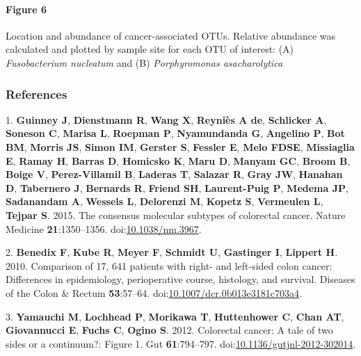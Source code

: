 \documentclass[11pt,]{article}
\let\oldparagraph\paragraph
\renewcommand{\paragraph}[1]{\oldparagraph{#1}\mbox{}}
\begin{document}
\paragraph{Figure 6}\label{figure-6}

Location and abundance of cancer-associated OTUs. Relative abundance was
calculated and plotted by sample site for each OTU of interest: (A)
\emph{Fusobacterium nucleatum} and (B) \emph{Porphyromonas
asacharolytica}

\subsubsection*{References}\label{references}

\hypertarget{refs}{}
\hypertarget{ref-Guinney2015}{}
1. \textbf{Guinney J}, \textbf{Dienstmann R}, \textbf{Wang X},
\textbf{Reyniès A de}, \textbf{Schlicker A}, \textbf{Soneson C},
\textbf{Marisa L}, \textbf{Roepman P}, \textbf{Nyamundanda G},
\textbf{Angelino P}, \textbf{Bot BM}, \textbf{Morris JS}, \textbf{Simon
IM}, \textbf{Gerster S}, \textbf{Fessler E}, \textbf{Melo FDSE},
\textbf{Missiaglia E}, \textbf{Ramay H}, \textbf{Barras D},
\textbf{Homicsko K}, \textbf{Maru D}, \textbf{Manyam GC}, \textbf{Broom
B}, \textbf{Boige V}, \textbf{Perez-Villamil B}, \textbf{Laderas T},
\textbf{Salazar R}, \textbf{Gray JW}, \textbf{Hanahan D},
\textbf{Tabernero J}, \textbf{Bernards R}, \textbf{Friend SH},
\textbf{Laurent-Puig P}, \textbf{Medema JP}, \textbf{Sadanandam A},
\textbf{Wessels L}, \textbf{Delorenzi M}, \textbf{Kopetz S},
\textbf{Vermeulen L}, \textbf{Tejpar S}. 2015. The consensus molecular
subtypes of colorectal cancer. Nature Medicine \textbf{21}:1350--1356.
doi:\href{https://doi.org/10.1038/nm.3967}{10.1038/nm.3967}.

\hypertarget{ref-Benedix2010}{}
2. \textbf{Benedix F}, \textbf{Kube R}, \textbf{Meyer F},
\textbf{Schmidt U}, \textbf{Gastinger I}, \textbf{Lippert H}. 2010.
Comparison of 17, 641 patients with right- and left-sided colon cancer:
Differences in epidemiology, perioperative course, histology, and
survival. Diseases of the Colon \& Rectum \textbf{53}:57--64.
doi:\href{https://doi.org/10.1007/dcr.0b013e3181c703a4}{10.1007/dcr.0b013e3181c703a4}.

\hypertarget{ref-Yamauchi2012}{}
3. \textbf{Yamauchi M}, \textbf{Lochhead P}, \textbf{Morikawa T},
\textbf{Huttenhower C}, \textbf{Chan AT}, \textbf{Giovannucci E},
\textbf{Fuchs C}, \textbf{Ogino S}. 2012. Colorectal cancer: A tale of
two sides or a continuum?: Figure 1. Gut \textbf{61}:794--797.
doi:\href{https://doi.org/10.1136/gutjnl-2012-302014}{10.1136/gutjnl-2012-302014}.
\end{document}
